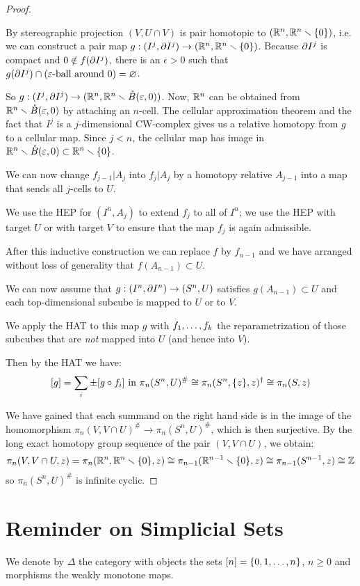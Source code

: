 \begin{proof}
\begin{claimproof}
By stereographic projection $(V,U\cap V)$ is pair homotopic to $({\mathbb R}^n,{\mathbb R}^n\smallsetminus\{0\})$, i.e. we can construct a pair map $g:(I^j,\partial I^j)\to ({\mathbb R}^n,{\mathbb R}^n\smallsetminus\{0\})$. Because $\partial I^j$ is compact and $0\notin f(\partial I^j)$, there is an $\epsilon>0$ such that $g(\partial I^j)\cap(\varepsilon\text{-ball around }0)=\varnothing$.

So $g:(I^j,\partial I^j)\to({\mathbb R}^n,{\mathbb R}^n\smallsetminus\mathring B(\varepsilon,0))$. Now, ${\mathbb R}^n$ can be obtained from ${\mathbb R}^n\smallsetminus\mathring B(\varepsilon,0)$ by attaching an $n$-cell. The cellular approximation theorem and the fact that $I^j$ is a $j$-dimensional CW-complex gives us a relative homotopy from $g$ to a cellular map. Since $j<n$, the cellular map has image in ${\mathbb R}^n\smallsetminus\mathring B(\varepsilon,0)\subset{\mathbb R}^n\smallsetminus\{0\}$.
\end{claimproof}

We can now change $f_{j-1}|A_j$ into $f_j|A_j$ by a homotopy relative $A_{j-1}$ into a map that sends all $j$-cells to $U$.

We use the HEP for $(I^n,A_j)$ to extend $f_j$ to all of $I^n$; we use the HEP with target $U$ or with target $V$ to ensure that the map $f_j$ is again admissible.

After this inductive construction we can replace $f$ by $f_{n-1}$ and we have arranged without loss of generality that $f(A_{n-1})\subset U$.

We can now assume that $g:(I^n,\partial I^n)\to(S^n,U)$ satisfies $g(A_{n-1})\subset U$ and each top-dimensional subcube is mapped to $U$ or to $V$.

We apply the HAT to this map $g$ with ${{f}_1,\dots,{f}_{k}}$ the reparametrization of those subcubes that are \textit{not} mapped into $U$ (and hence into $V$).

Then by the HAT we have:
\[[g]=\sum_i\pm[g\circ f_i]\text{ in }\pi_n(S^n,U)^\#\cong\pi_n(S^n,\{z\},z)^\dagger\cong\pi_n(S,z)\]

We have gained that each summand on the right hand side is in the image of the homomorphism $\pi_n(V,V\cap U)^\#\to\pi_n(S^n,U)^\#$, which is then surjective. By the long exact homotopy group sequence of the pair $(V,V\cap U)$, we obtain:
\[\pi_n(V,V\cap U,z)=\pi_n({\mathbb R}^n,{\mathbb R}^n\smallsetminus\{0\},z)\cong\pi_{n-1}({\mathbb R}^{n-1}\smallsetminus\{0\},z)\cong\pi_{n-1}(S^{n-1},z)\cong{\mathbb Z}\]
so $\pi_n(S^n,U)^\#$ is infinite cyclic.
\end{proof}

\section{Reminder on Simplicial Sets}\label{section:reminder-on-sset}
We denote by $\Delta$ the category with objects the sets $[n]=\{0,1,\dots,n\}$, $n\geq 0$ and morphisms the weakly monotone maps.

